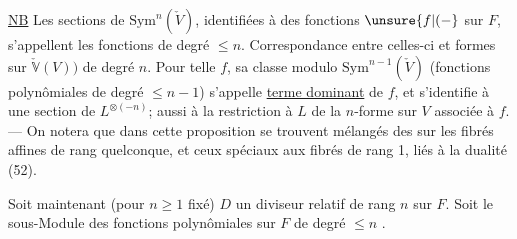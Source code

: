 \uline{NB} Les sections de $\mathrm{Sym}^n(\check V)$, identifiées à des
fonctions $\unsure{f|(-}$ sur $F$, s'appellent les fonctions  de
degré $\leq n$. Correspondance entre celles-ci et
formes sur $\check{\mathbb V}(V))$ de degré $n$. Pour  telle
$f$, sa classe modulo $\mathrm{Sym}^{n-1}(\check V)$ (fonctions
polynômiales de degré $\leq n-1$) s'appelle
\uline{terme dominant} de $f$, et s'identifie
à une section de $L^{\otimes(-n)}$;   aussi à
la restriction à $L$ de la $n$-forme sur $V$ associée
à $f$. --- On notera que dans cette proposition
se trouvent mélangés des   sur les
fibrés affines de rang quelconque, et ceux
spéciaux aux fibrés de rang 1, liés à
la dualité (52).

Soit maintenant (pour $n\geq1$ fixé) $D$ un
diviseur relatif de rang $n$ sur $F$. Soit
 le sous-Module
des fonctions polynômiales sur $F$ de degré $\leq n$
 .

